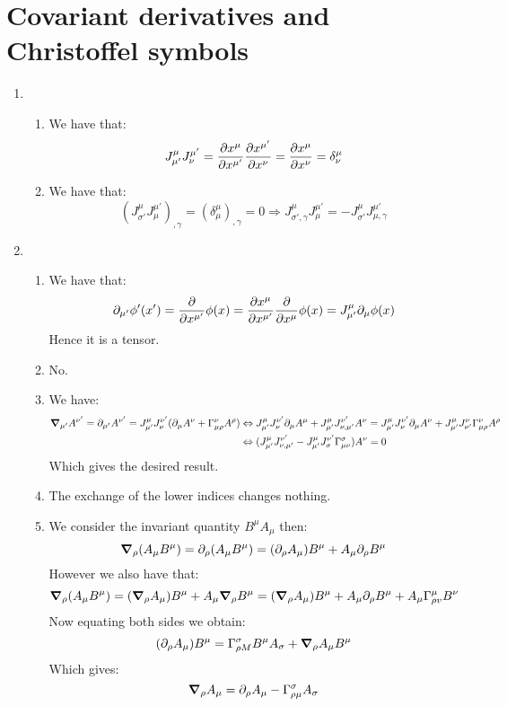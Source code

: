 \documentclass[10pt,a4paper]{book}
\begin{document}
\section{Covariant derivatives and Christoffel symbols}
\begin{enumerate}
\item \begin{enumerate}
\item We have that:
\[
J^\mu_{\mu'} J^{\mu'}_{\nu} = \pdv{x^{\mu}}{x^{\mu'}} \pdv{x^{\mu'}}{x^\nu} = \pdv{x^{\mu}}{x^\nu} = \delta_\nu^\mu
\]
\item We have that:
\[
\left(J_{\sigma'}^\mu J_\mu^{\mu'} \right)_{, \gamma} = \left(\delta_{\mu}^\mu \right)_{, \gamma} = 0 \Rightarrow J_{\sigma', \gamma}^\mu J_\mu^{\mu'} = - J_{\sigma'}^\mu J_{\mu, \gamma}^{\mu'}
\]
\end{enumerate}

\item \begin{enumerate}

\item We have that:
\[
\partial_{\mu'}\phi'(x') = \pdv{}{x^{\mu'}} \phi(x) = \pdv{x^\mu}{x^{\mu'}} \pdv{}{x^\mu} \phi(x) = J_{\mu'}^\mu \partial_\mu \phi(x)
\]
Hence it is a tensor. 

\item No.

\item We have:
\begin{align*}
\grad_{\mu'}A^{\nu'} = \partial_{\mu'}A^{\nu'} = J_{\mu'}^\mu J_{\nu}^{\nu'} ( \partial_{\mu} A^\nu + \Gamma_{\mu \rho}^\nu A^\rho) &\Leftrightarrow J_{\mu'}^\mu J_{\nu}^{\nu'} \partial_{\mu} A^{\mu} + J_{\mu'}^\mu J_{\nu, \mu'}^{\nu'} A^\nu = J_{\mu'}^\mu J_{\nu}^{\nu'} \partial_{\mu} A^\nu + J_{\mu'}^\mu J_{\nu'}^\nu \Gamma_{\mu \rho}^\nu A^\rho\\
&\Leftrightarrow (J_{\mu'}^\mu J_{\nu, \mu'}^{\nu'} - J_{\mu'}^\mu J_{\sigma}^{\nu'} \Gamma_{\mu \nu}^\sigma) A^\nu = 0
\end{align*}
Which gives the desired result.

\item The exchange of the lower indices changes nothing.

\item We consider the invariant quantity $B^\mu A_\mu$ then:
\[
\grad_\rho(A_\mu B^\mu) = \partial_\rho(A_\mu B^\mu) = (\partial_\rho A_\mu)B^\mu + A_\mu \partial_\rho B^\mu
\]
However we also have that:
\[
\grad_\rho(A_\mu B^\mu) = (\grad_\rho A_\mu) B^\mu + A_\mu \grad_\rho B^\mu = (\grad_\rho A_\mu) B^\mu + A_\mu \partial_\rho B^\mu + A_\mu \Gamma_{\rho v}^\mu B^\nu
\]
Now equating both sides we obtain:
\[
(\partial_\rho A_\mu) B^\mu = \Gamma_{\rho M}^{\sigma} B^\mu A_\sigma + \grad_\rho A_\mu B^\mu
\]
Which gives:
\[
\grad_\rho A_\mu = \partial_\rho A_\mu - \Gamma_{\rho \mu}^\sigma A_\sigma
\]


\end{enumerate}
\end{enumerate}
\end{document}
